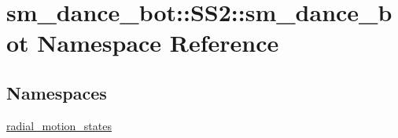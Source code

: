\hypertarget{namespacesm__dance__bot_1_1SS2_1_1sm__dance__bot}{}\section{sm\+\_\+dance\+\_\+bot\+:\+:S\+S2\+:\+:sm\+\_\+dance\+\_\+bot Namespace Reference}
\label{namespacesm__dance__bot_1_1SS2_1_1sm__dance__bot}
\subsection*{Namespaces}
\begin{DoxyCompactItemize}
\item 
 \hyperlink{namespacesm__dance__bot_1_1SS2_1_1sm__dance__bot_1_1radial__motion__states}{radial\+\_\+motion\+\_\+states}
\end{DoxyCompactItemize}
